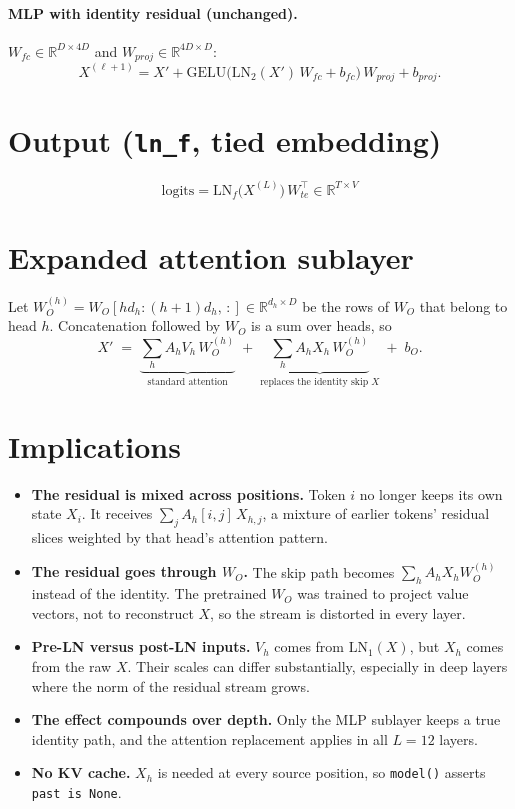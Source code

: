 \documentclass[11pt]{article}
\newcommand{\code}[1]{\texttt{#1}}
\begin{document}
\paragraph{MLP with identity residual (unchanged).} $W_{fc}\in\mathbb{R}^{D\times 4D}$
and $W_{proj}\in\mathbb{R}^{4D\times D}$:
\[
X^{(\ell+1)} = X' + \mathrm{GELU}\!\big(\mathrm{LN}_2(X')\,W_{fc} + b_{fc}\big)\,W_{proj} + b_{proj}.
\]

\section{Output \quad (\code{ln\_f}, tied embedding)}
\[
\text{logits} = \mathrm{LN}_f\big(X^{(L)}\big)\, W_{te}^{\top} \in \mathbb{R}^{T\times V}
\]

\section{Expanded attention sublayer}
Let $W_O^{(h)} = W_O[h d_h:(h+1) d_h,\,:] \in \mathbb{R}^{d_h\times D}$ be the rows of
$W_O$ that belong to head $h$. Concatenation followed by $W_O$ is a sum over heads, so
\[
X' \;=\; \underbrace{\sum_{h} A_h V_h\, W_O^{(h)}}_{\text{standard attention}}
\;+\; \underbrace{\sum_{h} A_h X_h\, W_O^{(h)}}_{\text{replaces the identity skip } X}
\;+\; b_O .
\]

\section{Implications}
\begin{itemize}
  \item \textbf{The residual is mixed across positions.} Token $i$ no longer keeps its own
        state $X_i$. It receives $\sum_j A_h[i,j]\,X_{h,j}$, a mixture of earlier tokens'
        residual slices weighted by that head's attention pattern.
  \item \textbf{The residual goes through $W_O$.} The skip path becomes
        $\sum_h A_h X_h W_O^{(h)}$ instead of the identity. The pretrained $W_O$ was trained to
        project value vectors, not to reconstruct $X$, so the stream is distorted in every layer.
  \item \textbf{Pre-LN versus post-LN inputs.} $V_h$ comes from $\mathrm{LN}_1(X)$, but $X_h$
        comes from the raw $X$. Their scales can differ substantially, especially in deep
        layers where the norm of the residual stream grows.
  \item \textbf{The effect compounds over depth.} Only the MLP sublayer keeps a true identity
        path, and the attention replacement applies in all $L=12$ layers.
  \item \textbf{No KV cache.} $X_h$ is needed at every source position, so
        \code{model()} asserts \code{past is None}.
\end{itemize}
\end{document}
